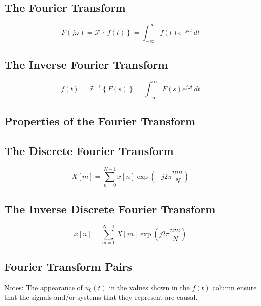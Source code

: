 \subsection*{The Fourier Transform}

$$
F(j\omega) = \mathcal{F}\left\{f(t)\right\} = \int_{-\infty}^{\infty} f(t)e^{-j\omega t}\,dt
$$

\subsection*{The Inverse Fourier Transform}

$$
f(t) = \mathcal{F}^{-1}\left\{F(s)\right\} = \int_{-\infty}^{\infty} F(s)e^{j\omega t}\,dt
$$

\subsection*{Properties of the Fourier Transform}

\subsection*{The Discrete Fourier Transform}

$$
X[m] = \sum_{n=0}^{N-1} x[n]\exp(-j2\pi\frac{nm}{N})
$$

\subsection*{The Inverse Discrete Fourier Transform}

$$
x[n] = \sum_{m=0}^{N-1} X[m]\exp(j2\pi\frac{nm}{N})
$$

\subsection*{Fourier Transform Pairs}
Notes: The appearance of $u_0(t)$ in the values shown in the $f(t)$ column ensure that 
the signals and/or systems that they represent are causal.
    
\endinput
